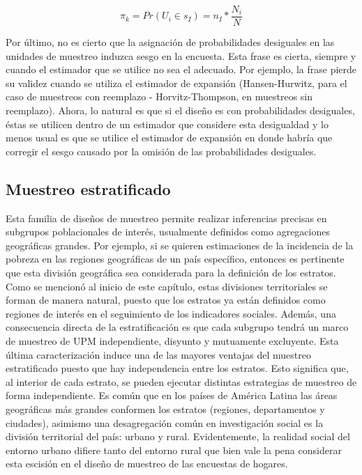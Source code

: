 \documentclass[
  12pt,
  spanish,
]{book}
\begin{document}
\[\pi_k = Pr(U_i \in s_I) = n_I * \frac{N_i}{N}\]

Por último, no es cierto que la asignación de probabilidades desiguales en las unidades de muestreo induzca sesgo en la encuesta. Esta frase es cierta, siempre y cuando el estimador que se utilice no sea el adecuado. Por ejemplo, la frase pierde su validez cuando se utiliza el estimador de expansión (Hansen-Hurwitz, para el caso de muestreos con reemplazo - Horvitz-Thompson, en muestreos sin reemplazo). Ahora, lo natural es que si el diseño es con probabilidades desiguales, éstas se utilicen dentro de un estimador que considere esta desigualdad y lo menos usual es que se utilice el estimador de expansión en donde habría que corregir el sesgo causado por la omisión de las probabilidades desiguales.

\hypertarget{muestreo-estratificado}{%
\subsection*{Muestreo estratificado}\label{muestreo-estratificado}}

Esta familia de diseños de muestreo permite realizar inferencias precisas en subgrupos poblacionales de interés, usualmente definidos como agregaciones geográficas grandes. Por ejemplo, si se quieren estimaciones de la incidencia de la pobreza en las regiones geográficas de un país específico, entonces es pertinente que esta división geográfica sea considerada para la definición de los estratos. Como se mencionó al inicio de este capítulo, estas divisiones territoriales se forman de manera natural, puesto que los estratos ya están definidos como regiones de interés en el seguimiento de los indicadores sociales. Además, una consecuencia directa de la estratificación es que cada subgrupo tendrá un marco de muestreo de UPM independiente, disyunto y mutuamente excluyente. Esta última caracterización induce una de las mayores ventajas del muestreo estratificado puesto que hay independencia entre los estratos. Esto significa que, al interior de cada estrato, se pueden ejecutar distintas estrategias de muestreo de forma independiente. Es común que en los países de América Latina las áreas geográficas más grandes conformen los estratos (regiones, departamentos y ciudades), asimismo una desagregación común en investigación social es la división territorial del país: urbano y rural. Evidentemente, la realidad social del entorno urbano difiere tanto del entorno rural que bien vale la pena considerar esta escisión en el diseño de muestreo de las encuestas de hogares.
\end{document}
